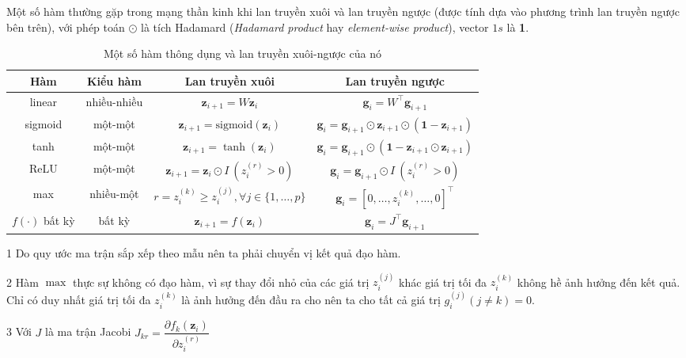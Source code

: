 Một số hàm thường gặp trong mạng thần kinh khi lan truyền xuôi và lan truyền ngược (được tính dựa vào phương trình lan truyền ngược bên trên), với phép toán $\odot$ là tích Hadamard (\textit{Hadamard product} hay \textit{element-wise product}), vector $1s$ là \textbf 1.
\begin{table}[htbp]
    \centering
    \caption{Một số hàm thông dụng và lan truyền xuôi-ngược của nó \cite{Aggarwal2023}}
    \label{table:derivative-forward-backward}
    \begin{threeparttable}
        \begin{tabularx}{\textwidth}{ c c C{1} C{1} }
            \toprule
            \textbf{Hàm}      & \textbf{Kiểu hàm} & \textbf{Lan truyền xuôi}                              & \textbf{Lan truyền ngược}                                                           \\\midrule
            linear            & nhiều-nhiều       & $\mathbf z_{i+1}=W\mathbf z_i$                        & $\mathbf g_i=W^\intercal\mathbf g_{i+1}$                                   \\\midrule
            sigmoid           & một-một           & $\mathbf z_{i+1}=\text{sigmoid}(\mathbf z_i)$         & $\mathbf g_i=\mathbf g_{i+1}\odot\mathbf z_{i+1}\odot(\mathbf 1-\mathbf z_{i+1})$   \\\midrule
            tanh              & một-một           & $\mathbf z_{i+1}=\tanh(\mathbf z_i)$                  & $\mathbf g_i=\mathbf g_{i+1}\odot(\mathbf 1 - \mathbf z_{i+1}\odot\mathbf z_{i+1})$ \\\midrule
            ReLU              & một-một           & $\mathbf z_{i+1}=\mathbf z_i\odot I\ (z_i^{(r)}>0)$   & $\mathbf g_i=\mathbf g_{i+1}\odot I\ (z_i^{(r)}>0)$                                 \\\midrule
            max               & nhiều-một         & $r=z_i^{(k)}\geq z_i^{(j)},\forall j\in\{1,\dots,p\}$ & $\mathbf g_i=[0,\dots,z_i^{(k)},\dots,0]^\intercal$                        \\\midrule
            $f(\cdot)$ bất kỳ & bất kỳ            & $\mathbf z_{i+1}=f(\mathbf z_i)$                      & $\mathbf g_i=J^\intercal\mathbf g_{i+1}$                                   \\
            \bottomrule
        \end{tabularx}
        \begin{tablenotes}
            \item[1] Do quy ước ma trận sắp xếp theo mẫu nên ta phải chuyển vị kết quả đạo hàm.
            \item[2] Hàm $\max$ thực sự không có đạo hàm, vì sự thay đổi nhỏ của các giá trị $z_i^{(j)}$ khác giá trị tối đa $z_i^{(k)}$ không hề ảnh hưởng đến kết quả. Chỉ có duy nhất giá trị tối đa $z_i^{(k)}$ là ảnh hưởng đến đầu ra cho nên ta cho tất cả giá trị $g_i^{(j)}(j\neq k)=0$.
            \item[3] Với $J$ là ma trận Jacobi $J_{kr}=\dfrac{\partial f_k(\mathbf z_i)}{\partial z_i^{(r)}}$
        \end{tablenotes}
    \end{threeparttable}
\end{table}


